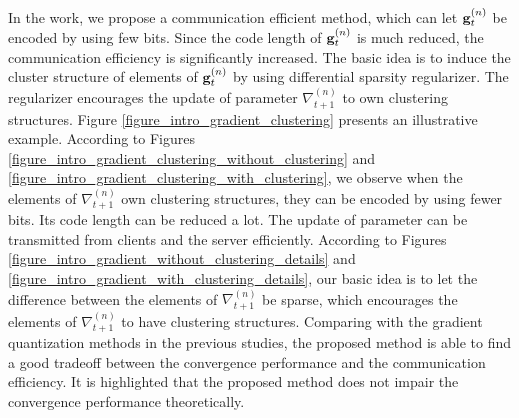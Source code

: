 \documentclass[journal]{IEEEtran}
\begin{document}
In the work, we propose a communication efficient method, which can let ${\bf g}_t^{(n)}$ be encoded by using few bits. Since the code length of ${\bf g}_t^{(n)}$ is much reduced, the communication efficiency is significantly increased. The basic idea is to induce the cluster structure of elements of ${\bf g}_t^{(n)}$ by using differential sparsity regularizer. The regularizer encourages the update of parameter $\nabla_{t+1}^{(n)}$ to own clustering structures. Figure \ref{figure_intro_gradient_clustering} presents an illustrative example. According to Figures \ref{figure_intro_gradient_clustering_without_clustering} and \ref{figure_intro_gradient_clustering_with_clustering},  we observe when the elements of $\nabla_{t+1}^{(n)}$ own clustering structures, they can be encoded by using fewer bits. Its code length can be reduced a lot. The update of parameter can be transmitted from clients  and the server efficiently. According to Figures \ref{figure_intro_gradient_without_clustering_details} and \ref{figure_intro_gradient_with_clustering_details}, our basic idea is to let the difference between the elements of $\nabla_{t+1}^{(n)}$ be sparse, which encourages the elements of $\nabla_{t+1}^{(n)}$ to have clustering structures. Comparing with the gradient quantization methods in the previous studies, the proposed method is able to find a good tradeoff between the convergence performance and the communication efficiency.  It is highlighted that the proposed method does not impair the convergence performance theoretically. 
\end{document}
